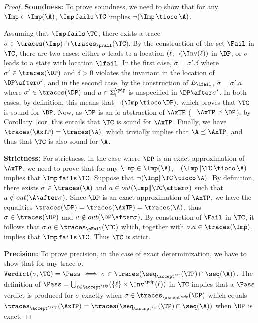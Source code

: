 \documentclass{LMCS}
\theoremstyle{plain}\newtheorem{proposition}[thm]{Proposition}
\begin{document}
\begin{proof}

{\bf Soundness:}
To prove soundness, we need to show that for any $\Imp \in \Imp(\A)$,
$\Imp \, {\tt fails} \, \TC$ implies $\neg(\Imp \, \tioco \, \A)$.

Assuming that $\Imp \, {\tt fails} \, \TC$, there exists a trace
$\sigma \in \traces(\Imp) \cap \traces_{\pFail}(\TC)$.  By the
construction of the set $\Fail$ in $\TC$, there are two cases: either
$\sigma$ leads to a location $(\ell,\neg(\Inv(\ell))$ in $\DP$, or
$\sigma$ leads to a state with location $\lfail$.  In the first case,
$\sigma=\sigma'.\delta$ where $\sigma' \in \traces(\DP)$ and $\delta >
0$ violates the invariant in the location of $\DP \after \sigma'$, and
in the second case, by the construction of $E_{\lfail}$,
$\sigma=\sigma'.a$ where $\sigma' \in \traces(\DP)$ and $a \in
\Sigma_!^\pdp$ is unspecified in $\DP \after \sigma'$.  In both cases,
by definition, this means that $\neg (\Imp \, \tioco\,\DP)$, which
proves that $\TC$ is sound for $\DP$.  Now, as $\DP$ is an
io-abstraction of $\AxTP$ (\ie~ $\AxTP \preceq \DP$), by
Corollary~\ref{cor} this entails that $\TC$ is sound for $\AxTP$.
Finally, we have $\traces(\AxTP)=\traces(\A)$, which trivially implies
that $\A \preceq \AxTP$, and thus that $\TC$ is also sound for $\A$.

{\bf Strictness:}
For strictness, in the case where $\DP$ is an exact approximation of $\AxTP$, 
we need to prove that for any $\Imp \in \Imp(\A)$,
$\neg (\Imp \| \TC \, \tioco \, \A)$ implies that $\Imp \, {\tt fails} \,\TC$.
Suppose that  $\neg (\Imp \| \TC \, \tioco \, \A)$. 
By definition, there exists
$\sigma \in \traces(\A)$ and $a \in out(\Imp \| \TC  \after 
\sigma)$ such that $a \notin out(\A \after  \sigma)$.  
Since $\DP$ is an exact approximation of $\AxTP$, we have 
the equalities $\traces(\DP)
=\traces(\AxTP)=\traces(\A)$, thus $\sigma \in \traces(\DP)$ and $a
\notin out(\DP \after  \sigma)$.  
By construction of $\Fail$ in $\TC$, it
follows that $\sigma.a \in \traces_{\pFail}(\TC)$ which, together with
$\sigma.a \in \traces(\Imp)$, implies that $\Imp \, {\tt fails} \,\TC$.  Thus
$\TC$ is strict.  

{\bf Precision:}
To prove precision, in the case of exact determinization, 
we have to show that 
for any trace $\sigma$,
${\tt Verdict}(\sigma, \TC) = \Pass
\iff \sigma \in \traces(\seq_{\accept^\tp}(\TP) \cap \seq(\A))$.
The definition of 
$\Pass = \bigcup_{\ell\in\accept^\pdp} (\{\ell\} \times\Inv^\pdp(\ell))$  in $\TC$ 
implies that a $\Pass$ verdict is produced for $\sigma$ 
exactly when $\sigma \in \traces_{\accept^\pdp}(\DP)$ which equals
$\traces_{\accept^\axtp}(\AxTP)=
\traces(\seq_{\accept^\tp}(\TP) \cap \seq(\A))$   when $\DP$ is exact.
\end{proof}
\end{document}
